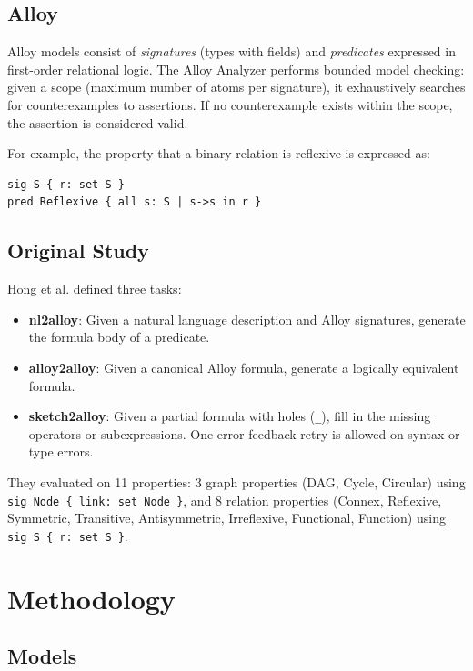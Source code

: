 \documentclass[11pt]{article}
\begin{document}
\subsection{Alloy}

Alloy models consist of \emph{signatures} (types with fields) and \emph{predicates} expressed in first-order relational logic. The Alloy Analyzer performs bounded model checking: given a scope (maximum number of atoms per signature), it exhaustively searches for counterexamples to assertions. If no counterexample exists within the scope, the assertion is considered valid.

For example, the property that a binary relation is reflexive is expressed as:
\begin{verbatim}
sig S { r: set S }
pred Reflexive { all s: S | s->s in r }
\end{verbatim}

\subsection{Original Study}

Hong et al. defined three tasks:
\begin{itemize}
  \item \textbf{nl2alloy}: Given a natural language description and Alloy signatures, generate the formula body of a predicate.
  \item \textbf{alloy2alloy}: Given a canonical Alloy formula, generate a logically equivalent formula.
  \item \textbf{sketch2alloy}: Given a partial formula with holes (\texttt{\_}), fill in the missing operators or subexpressions. One error-feedback retry is allowed on syntax or type errors.
\end{itemize}

They evaluated on 11 properties: 3 graph properties (DAG, Cycle, Circular) using \texttt{sig Node \{ link: set Node \}}, and 8 relation properties (Connex, Reflexive, Symmetric, Transitive, Antisymmetric, Irreflexive, Functional, Function) using \texttt{sig S \{ r: set S \}}.

\section{Methodology}

\subsection{Models}
\end{document}
